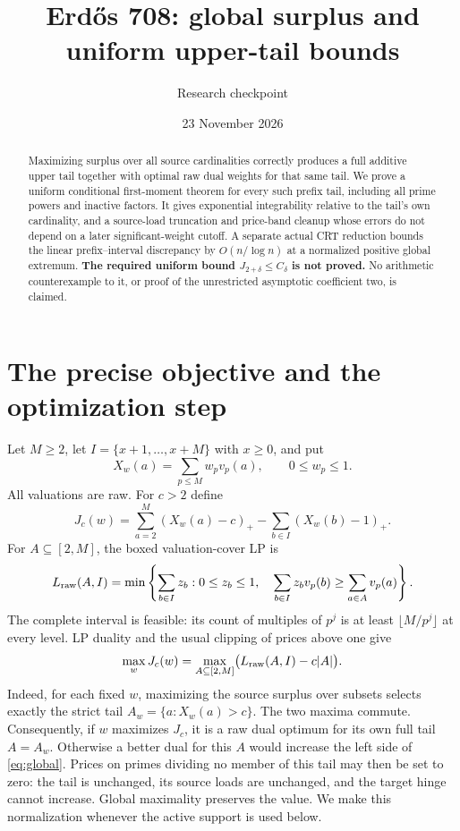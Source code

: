 \documentclass[11pt,a4paper]{article}
\title{Erd\H{o}s 708: global surplus and uniform upper-tail bounds}
\author{Research checkpoint}
\date{23 November 2026}
\newcommand{\pos}[1]{\left(#1\right)_+}
\newcommand{\LP}{L_{\rm raw}}
\begin{document}
\maketitle
\begin{abstract}
Maximizing surplus over all source cardinalities correctly produces a full
additive upper tail together with optimal raw dual weights for that same
tail. We prove a uniform conditional first-moment theorem for every such
prefix tail, including all prime powers and inactive factors. It gives
exponential integrability relative to the tail's own cardinality, and a
source-load truncation and price-band cleanup whose errors do not depend
on a later significant-weight cutoff. A separate actual CRT reduction
bounds the linear prefix--interval discrepancy by $O(n/\log n)$ at a
normalized positive global extremum. \textbf{The required uniform bound
$J_{2+\delta}\le C_\delta$ is not proved.} No arithmetic counterexample
to it, or proof of the unrestricted asymptotic coefficient two, is claimed.
\end{abstract}

\section{The precise objective and the optimization step}

Let $M\ge2$, let $I=\{x+1,\ldots,x+M\}$ with $x\ge0$, and put
\[
 X_w(a)=\sum_{p\le M}w_pv_p(a),\qquad 0\le w_p\le1.
\]
All valuations are raw. For $c>2$ define
\[
 J_c(w)=\sum_{a=2}^M\pos{X_w(a)-c}
          -\sum_{b\in I}\pos{X_w(b)-1}.
\]
For $A\subseteq[2,M]$, the boxed valuation-cover LP is
\[
 \LP(A,I)=\min\left\{\sum_{b\in I}z_b:
 0\le z_b\le1,\quad
 \sum_{b\in I}z_bv_p(b)\ge\sum_{a\in A}v_p(a)\right\}.
\]
The complete interval is feasible: its count of multiples of $p^j$
is at least $\lfloor M/p^j\rfloor$ at every level. LP duality and
the usual clipping of prices above one give
\begin{equation}
 \max_w J_c(w)=\max_{A\subseteq[2,M]}
                 \bigl(\LP(A,I)-c|A|\bigr).             \label{eq:global}
\end{equation}
Indeed, for each fixed $w$, maximizing the source surplus over subsets
selects exactly the strict tail $A_w=\{a:X_w(a)>c\}$. The two maxima
commute. Consequently, if $w$ maximizes $J_c$, it is a raw dual optimum
for its own full tail $A=A_w$. Otherwise a better dual for this $A$
would increase the left side of \eqref{eq:global}.
Prices on primes dividing no member of this tail may then be set to
zero: the tail is unchanged, its source loads are unchanged, and the
target hinge cannot increase. Global maximality preserves the value.
We make this normalization whenever the active support is used below.
\end{document}
